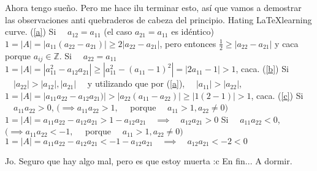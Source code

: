 \documentclass{article}
\newcommand\tab[1][0.6cm]{\hspace*{#1}}
\newcommand\nl{\newline\tab}
\begin{document}
	
	Ahora tengo sueño. Pero me hace ilu terminar esto, así que vamos a demostrar las observaciones anti quebraderos de cabeza del principio. Hating \LaTeX\space  learning curve.\nl	
	(\ref{a})\nl 
		 Si $\quad a_{12} = a_{11}$ (el caso $a_{21} = a_{11}$ es idéntico)\nl 
		\tab $1 = |A| = |a_{11}(a_{22}-a_{21})| \geq 2|a_{22}-a_{21}|$, pero entonces $\frac{1}{2} \geq |a_{22}-a_{21}|$ y caca porque $a_{ij} \in\mathbb{Z} $.\nl
		Si $\quad a_{22} = a_{11}$\nl
		\tab $1 = |A| = |a_{11}^2-a_{12}a_{21}| \geq |a_{11}^2-(a_{11}-1)^2| = |2a_{11} - 1 | > 1$, caca.\nl\nl
	(\ref{b})\nl
		Si $\quad|a_{22}| > |a_{12}|, |a_{21}|\quad$  y utilizando que por (\ref{a}), $\quad |a_{11}| > |a_{22}|$, \nl 
		\tab $1 = |A| = |a_{11}a_{22}-a_{12}a_{21})| > |a_{22}(a_{11}-a_{22})| \geq |1(2 - 1)| > 1 $, caca.\nl\nl
	(\ref{c})\nl
		Si $\quad a_{11}a_{22} > 0$, 	\nl $(\implies a_{11}a_{22} > 1,\quad$ porque $\quad a_{11} > 1, a_{22} \neq 0)$\nl\tab 
		$1 = |A| = a_{11}a_{22} - a_{12}a_{21} > 1 - a_{12}a_{21} \quad\implies\quad a_{12}a_{21} > 0$\nl
		Si $\quad a_{11}a_{22} < 0$, 	\nl $(\implies a_{11}a_{22} < - 1,\quad$ porque $\quad a_{11} > 1, a_{22} 	\neq 0)$\nl\tab 
		$1 = |A| = a_{11}a_{22} - a_{12}a_{21} < - 1 - a_{12}a_{21} \quad\implies\quad a_{12}a_{21} < -2 < 0$\nl
		
	Jo. Seguro que hay algo mal, pero es que estoy muerta :c \nl
	En fin...
	A dormir.
\end{document}
